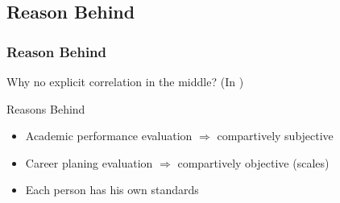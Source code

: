 \subsection{Reason Behind}
\begin{frame}
    \frametitle{Reason Behind}
    \Large
    Why no explicit correlation in the middle? (In )
    \begin{block}{Reasons Behind}
        \begin{itemize}[<+->]
            \item Academic performance evaluation $\Rightarrow$ compartively subjective
            \item Career planing evaluation $\Rightarrow$ compartively objective (scales)
            \item Each person has his own standards
        \end{itemize}
    \end{block}
\end{frame}
